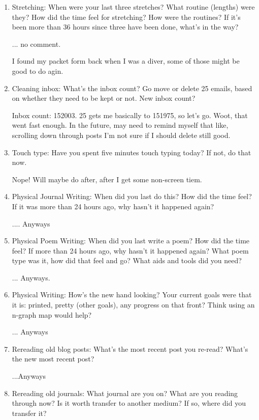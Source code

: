 \documentclass[12pt]{article}
\renewcommand{\,}{\textsuperscript{,}}
\begin{document}
\begin{enumerate}
See above. Not doing now, though.

\item Stretching: When were your last three stretches? What routine (lengths) were they? How did the time feel for stretching? How were the routines? If it's been more than 36 hours since three have been done, what's in the way?

... no comment.

I found my packet form back when I was a diver, some of those might be good to do agin.

\item Cleaning inbox: What's the inbox count? Go move or delete 25 emails, based on whether they need to be kept or not. New inbox count?

Inbox count: 152003. 25 gets me basically to 151975, so let's go. Woot, that went fast enough. In the future, may need to remind myself that like, scrolling down through posts I'm not sure if I should delete still good.

\item Touch type: Have you spent five minutes touch typing today? If not, do that now.

Nope! Will maybe do after, after I get some non-screen tiem.

\item Physical Journal Writing: When did you last do this? How did the time feel? If it was more than 24 hours ago, why hasn't it happened again?

.... Anyways

\item Physical Poem Writing: When did you last write a poem? How did the time feel? If more than 24 hours ago, why hasn't it happened again? What poem type was it, how did that feel and go? What aids and tools did you need?

... Anyways.

\item Physical Writing: How's the new hand looking? Your current goals were that it is: printed, pretty (other goals), any progress on that front? Think using an n-graph map would help?

... Anyways

\item Rereading old blog posts: What's the most recent post you re-read? What's the new most recent post?

...Anyways

\item Rereading old journals: What journal are you on? What are you reading through now? Is it worth transfer to another medium? If so, where did you transfer it?


\end{enumerate}
\end{document}
